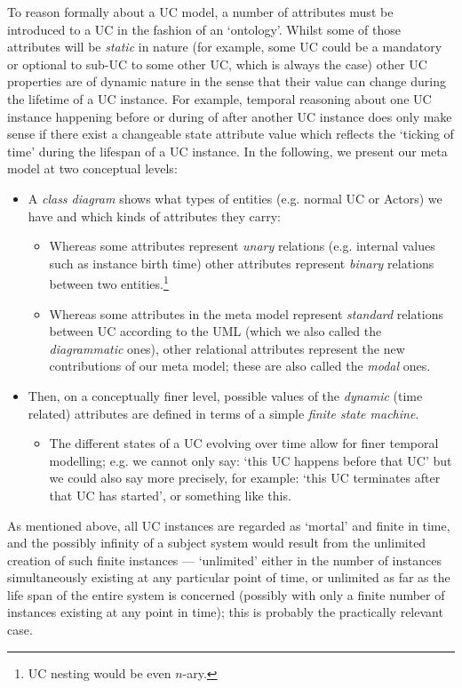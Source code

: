 To reason formally about a UC model, a number of attributes must 
be introduced to a UC in the fashion of an `ontology'. Whilst some 
of those attributes will be \emph{static} in nature (for example, 
some UC could be a mandatory or optional to sub-UC to some other 
UC, which is always the case) other UC properties are of dynamic 
nature in the sense that their value can change during the lifetime 
of a UC instance. For example, temporal reasoning about one UC 
instance happening before or during of after another UC instance
does only make sense if there exist a changeable state attribute 
value which reflects the `ticking of time' during the lifespan of 
a UC instance. In the following, we present our meta model at two 
conceptual levels:
\begin{itemize}
\item
A \emph{class diagram} shows what types of entities (e.g. normal 
UC or Actors) we have and which kinds of attributes they carry:
\begin{itemize}
\item
Whereas some attributes represent \emph{unary} relations (e.g. 
internal values such as instance birth time) other attributes 
represent \emph{binary} relations between two entities.\footnote{UC 
	nesting would be even $n$-ary.}
\item
Whereas some attributes in the meta model represent \emph{standard} 
relations between UC according to the UML (which we also called the 
\emph{diagrammatic} ones), other relational attributes represent 
the new contributions of our meta model; these are also called the 
\emph{modal} ones.
\end{itemize}
\item
Then, on a conceptually finer level, possible values of the \emph{dynamic} 
(time related) attributes are defined in terms of a simple \emph{finite 
state machine}.
\begin{itemize}
\item
The different states of a UC evolving over time allow for finer temporal 
modelling; e.g. we cannot only say: `this UC happens before that UC' but 
we could also say more precisely, for example: `this UC terminates after 
that UC has started', or something like this. 
\end{itemize}
\end{itemize}
As mentioned above, all UC instances are regarded as `mortal' and finite 
in time, and the possibly infinity of a subject system would result from 
the unlimited creation of such finite instances --- `unlimited' either 
in the number of instances simultaneously existing at any particular 
point of time, or unlimited as far as the life span of the entire system 
is concerned (possibly with only a finite number of instances existing 
at any point in time); this is probably the practically relevant case. 

